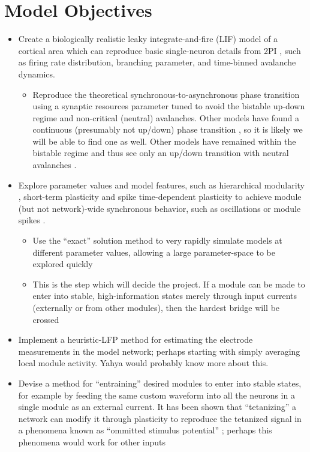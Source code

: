 \documentclass[a4paper, 12pt]{article}
\begin{document}
\section*{Model Objectives}
\begin{itemize}
\item Create a biologically realistic \cite{objectworkingmemory, biologicalsoc} leaky integrate-and-fire (LIF) model of a cortical area which can reproduce basic single-neuron details from 2PI \cite{bellaypaper}, such as firing rate distribution, branching parameter, and time-binned avalanche dynamics.
  \begin{itemize}
  \item Reproduce the theoretical synchronous-to-asynchronous phase transition \cite{munozlg} using a synaptic resources parameter tuned to avoid the bistable up-down regime and non-critical (neutral) avalanches. Other models have found a continuous (presumably not up/down) phase transition \cite{rubinov}, so it is likely we will be able to find one as well. Other models have remained within the bistable regime and thus see only an up/down transition with neutral avalanches \cite{neutraltheory}.
  \end{itemize}
\item Explore parameter values and model features, such as hierarchical modularity \cite{rubinov, mountcastle}, short-term plasticity \cite{dynamicsynapses} and spike time-dependent plasticity \cite{heterogeneousnetwork, biologicalsoc, rubinov} to achieve module (but not network)-wide synchronous behavior, such as oscillations \cite{munozlg} or module spikes \cite{rubinov}.
  \begin{itemize}
  \item Use the ``exact'' solution method to very rapidly simulate models at different parameter values, allowing a large parameter-space to be explored quickly \cite{exactsolution}
  \item This is the step which will decide the project. If a module can be made to enter into stable, high-information states merely through input currents (externally or from other modules), then the hardest bridge will be crossed
  \end{itemize}
\item Implement a heuristic-LFP method for estimating the electrode measurements in the model network; perhaps starting with simply averaging local module activity. Yahya would probably know more about this.
\item Devise a method for ``entraining'' desired modules to enter into stable states, for example by feeding the same custom waveform into all the neurons in a single module as an external current. It has been shown that ``tetanizing'' a network can modify it through plasticity to reproduce the tetanized signal in a phenomena known as ``ommitted stimulus potential'' \cite{heterogeneousnetwork}; perhaps this phenomena would work for other inputs
\end{itemize}
\end{document}
